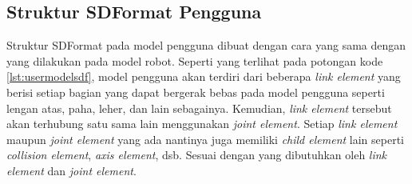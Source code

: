 \subsection{Struktur SDFormat Pengguna}
\label{subsec:sdformatpengguna}

Struktur SDFormat pada model pengguna dibuat dengan cara yang sama dengan yang dilakukan pada model robot.
Seperti yang terlihat pada potongan kode \ref{lst:usermodelsdf},
  model pengguna akan terdiri dari beberapa \emph{link element} yang berisi setiap bagian yang dapat bergerak bebas pada model pengguna seperti lengan atas, paha, leher, dan lain sebagainya.
Kemudian, \emph{link element} tersebut akan terhubung satu sama lain menggunakan \emph{joint element}.
Setiap \emph{link element} maupun \emph{joint element} yang ada nantinya juga memiliki \emph{child element} lain seperti \emph{collision element}, \emph{axis element}, dsb. Sesuai dengan yang dibutuhkan oleh \emph{link element} dan \emph{joint element}.


